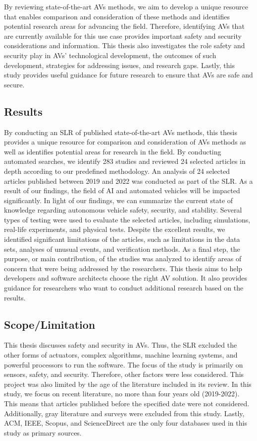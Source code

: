 \documentclass[a4paper,12pt]{article}
\begin{document}
By reviewing state-of-the-art AVs methods, we aim to develop a unique resource that enables comparison and consideration of these methods and identifies potential research areas for advancing the field. Therefore, identifying AVs that are currently available for this use case provides important safety and security considerations and information. This thesis also investigates the role safety and security play in AVs' technological development, the outcomes of such development, strategies for addressing issues, and research gaps. Lastly, this study provides useful guidance for future research to ensure that AVs are safe and secure.

\subsection{Results}

\hspace{5mm} By conducting an SLR of published state-of-the-art AVs methods, this thesis provides a unique resource for comparison and consideration of AVs methods as well as identifies potential areas for research in the field. By conducting automated searches, we identify 283 studies and reviewed 24 selected articles in depth according to our predefined methodology. An analysis of 24 selected articles published between 2019 and 2022 was conducted as part of the SLR. As a result of our findings, the field of AI and automated vehicles will be impacted significantly. In light of our findings, we can summarize the current state of knowledge regarding autonomous vehicle safety, security, and stability. Several types of testing were used to evaluate the selected articles, including simulations, real-life experiments, and physical tests. Despite the excellent results, we identified significant limitations of the articles, such as limitations in the data sets, analyses of unusual events, and verification methods. As a final step, the purpose, or main contribution, of the studies was analyzed to identify areas of concern that were being addressed by the researchers. This thesis aims to help developers and software architects choose the right AV solution. It also provides guidance for researchers who want to conduct additional research based on the results.

\subsection{Scope/Limitation}
\hspace{5mm} This thesis discusses safety and security in AVs. Thus, the SLR excluded the other forms of actuators, complex algorithms, machine learning systems, and powerful processors to run the software. The focus of the study is primarily on sensors, safety, and security. Therefore, other factors were less considered. This project was also limited by the age of the literature included in its review. In this study, we focus on recent literature, no more than four years old (2019-2022). This means that articles published before the specified date were not considered. Additionally, gray literature and surveys were excluded from this study. Lastly, ACM, IEEE, Scopus, and ScienceDirect are the only four databases used in this study as primary sources.
\end{document}
